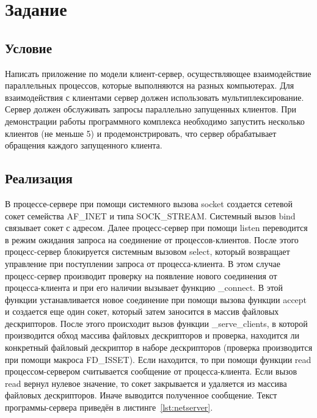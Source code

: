 \chapter{Задание }

\section{Условие}
Написать приложение по модели клиент-сервер, осуществляющее взаимодействие параллельных процессов, которые выполняются на разных компьютерах. Для взаимодействия с клиентами сервер должен использовать мультиплексирование. Сервер должен обслуживать запросы параллельно запущенных клиентов. При демонстрации работы программного комплекса необходимо запустить несколько клиентов (не меньше 5) и продемонстрировать, что сервер обрабатывает обращения каждого запущенного клиента.

\section{Реализация}

\sloppy В процессе-сервере при помощи системного вызова socket создается сетевой сокет семейства AF\_INET и типа SOCK\_STREAM\@. Системный вызов bind связывает сокет с адресом. Далее процесс-сервер при помощи listen переводится в режим ожидания запроса на соединение от процессов-клиентов. После этого процесс-сервер блокируется системным вызовом select, который возвращает управление при поступлении запроса от процесса-клиента. В этом случае процесс-сервер производит проверку на появление нового соединения от процесса-клиента и при его наличии вызывает функцию \_connect. В этой функции устанавливается новое соединение при помощи вызова функции accept и создается еще один сокет, который затем заносится в массив файловых дескрипторов. После этого происходит вызов функции \_serve\_clients, в которой производится обход массива файловых дескрипторов и проверка, находится ли конкретный файловый дескриптор в наборе дескрипторов (проверка производится при помощи макроса FD\_ISSET). Если находится, то при помощи функции read процессом-сервером считывается сообщение от процесса-клиента. Если вызов read вернул нулевое значение, то сокет закрывается и удаляется из массива файловых дескрипторов. Иначе выводится полученное сообщение. Текст программы-сервера приведён в листинге~\ref{lst:netserver}.

